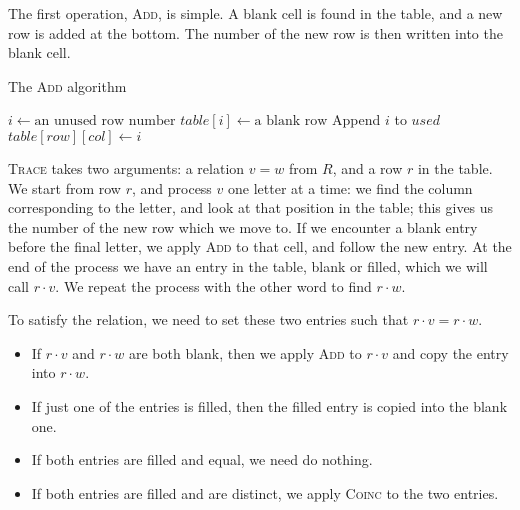 The first operation, \textsc{Add}, is simple.  A blank cell is found in the
table, and a new row is added at the bottom.  The number of the new row is then
written into the blank cell.

\begin{algorithm}
\caption{The \textsc{Add} algorithm}\label{euclid}
\begin{algorithmic}[1]
\State $i \gets \text{an unused row number}$
\State $table[i] \gets \text{a blank row}$
\State Append $i$ to $used$
\State $table[row][col] \gets i$
\EndProcedure
\end{algorithmic}
\end{algorithm}

\textsc{Trace} takes two arguments: a relation $v=w$ from $R$, and a row $r$
in the table.  We start from row $r$, and process $v$ one letter at a time: we
find the column corresponding to the letter, and look at that position in the
table; this gives us the number of the new row which we move to.  If we
encounter a blank entry before the final letter, we apply \textsc{Add} to that
cell, and follow the new entry.  At the end of the process we have an entry in
the table, blank or filled, which we will call $r \cdot v$.  We repeat the
process with the other word to find $r \cdot w$.

To satisfy the relation, we need to set these two entries such that
$r \cdot v = r \cdot w$.
\begin{itemize}
\item If $r \cdot v$ and $r \cdot w$ are both blank, then we apply
  \textsc{Add} to $r \cdot v$ and copy the entry into $r \cdot w$.
\item If just one of the entries is filled, then the filled entry is copied into
  the blank one.
\item If both entries are filled and equal, we need do nothing.
\item If both entries are filled and are distinct, we apply \textsc{Coinc} to
  the two entries.
\end{itemize}

